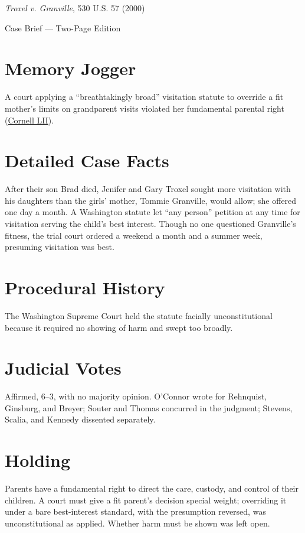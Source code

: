 \documentclass[12pt]{article}
\begin{document}
\begin{center}
{\LARGE \textit{Troxel v. Granville}, 530 U.S. 57 (2000)\par}
\vspace{0.5em}
{\large Case Brief --- Two-Page Edition\par}
\end{center}

\section{Memory Jogger}
A court applying a ``breathtakingly broad'' visitation statute to override a fit mother's limits on grandparent visits violated her fundamental parental right (\href{https://www.law.cornell.edu/supremecourt/text/99-138}{Cornell LII}).

\section{Detailed Case Facts}
After their son Brad died, Jenifer and Gary Troxel sought more visitation with his daughters than the girls' mother, Tommie Granville, would allow; she offered one day a month. A Washington statute let ``any person'' petition at any time for visitation serving the child's best interest. Though no one questioned Granville's fitness, the trial court ordered a weekend a month and a summer week, presuming visitation was best.

\section{Procedural History}
The Washington Supreme Court held the statute facially unconstitutional because it required no showing of harm and swept too broadly.

\section{Judicial Votes}
Affirmed, 6--3, with no majority opinion. O'Connor wrote for Rehnquist, Ginsburg, and Breyer; Souter and Thomas concurred in the judgment; Stevens, Scalia, and Kennedy dissented separately.

\section{Holding}
Parents have a fundamental right to direct the care, custody, and control of their children. A court must give a fit parent's decision special weight; overriding it under a bare best-interest standard, with the presumption reversed, was unconstitutional as applied. Whether harm must be shown was left open.
\end{document}
